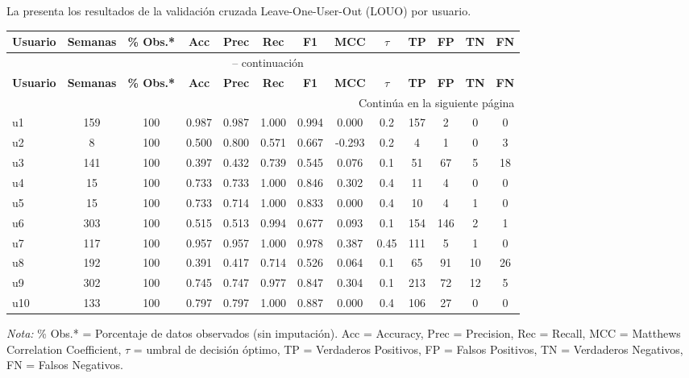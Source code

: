 La  presenta los resultados de la validación cruzada Leave-One-User-Out (LOUO) por usuario.

\begin{table}[p]
\centering
\caption{Rendimiento del Sistema Difuso por Usuario (Validación LOUO)}
\label{tab:rendimiento_louo}
\scriptsize
\begin{longtable}{@{}lcccccccccccc@{}}
\toprule
\textbf{Usuario} & \textbf{Semanas} & \textbf{\% Obs.*} & \textbf{Acc} & \textbf{Prec} & \textbf{Rec} & \textbf{F1} & \textbf{MCC} & \textbf{$\tau$} & \textbf{TP} & \textbf{FP} & \textbf{TN} & \textbf{FN} \\
\midrule
\endfirsthead
\multicolumn{13}{c}{\tablename\ \thetable{} -- continuación} \\
\toprule
\textbf{Usuario} & \textbf{Semanas} & \textbf{\% Obs.*} & \textbf{Acc} & \textbf{Prec} & \textbf{Rec} & \textbf{F1} & \textbf{MCC} & \textbf{$\tau$} & \textbf{TP} & \textbf{FP} & \textbf{TN} & \textbf{FN} \\
\midrule
\endhead
\midrule
\multicolumn{13}{r}{Continúa en la siguiente página} \\
\endfoot
\bottomrule
\endlastfoot
u1  & 159 & 100 & 0.987 & 0.987 & 1.000 & 0.994 & 0.000 & 0.2 & 157 & 2   & 0  & 0 \\
u2  & 8   & 100 & 0.500 & 0.800 & 0.571 & 0.667 & -0.293 & 0.2 & 4   & 1   & 0  & 3 \\
u3  & 141 & 100 & 0.397 & 0.432 & 0.739 & 0.545 & 0.076 & 0.1 & 51  & 67  & 5  & 18 \\
u4  & 15  & 100 & 0.733 & 0.733 & 1.000 & 0.846 & 0.302 & 0.4 & 11  & 4   & 0  & 0 \\
u5  & 15  & 100 & 0.733 & 0.714 & 1.000 & 0.833 & 0.000 & 0.4 & 10  & 4   & 1  & 0 \\
u6  & 303 & 100 & 0.515 & 0.513 & 0.994 & 0.677 & 0.093 & 0.1 & 154 & 146 & 2  & 1 \\
u7  & 117 & 100 & 0.957 & 0.957 & 1.000 & 0.978 & 0.387 & 0.45 & 111 & 5   & 1  & 0 \\
u8  & 192 & 100 & 0.391 & 0.417 & 0.714 & 0.526 & 0.064 & 0.1 & 65  & 91  & 10 & 26 \\
u9  & 302 & 100 & 0.745 & 0.747 & 0.977 & 0.847 & 0.304 & 0.1 & 213 & 72  & 12 & 5 \\
u10 & 133 & 100 & 0.797 & 0.797 & 1.000 & 0.887 & 0.000 & 0.4 & 106 & 27  & 0  & 0 \\
\end{longtable}
\begin{flushleft}
\small
\textit{Nota:} \% Obs.* = Porcentaje de datos observados (sin imputación). Acc = Accuracy, Prec = Precision, Rec = Recall, MCC = Matthews Correlation Coefficient, $\tau$ = umbral de decisión óptimo, TP = Verdaderos Positivos, FP = Falsos Positivos, TN = Verdaderos Negativos, FN = Falsos Negativos.
\end{flushleft}
\end{table}

